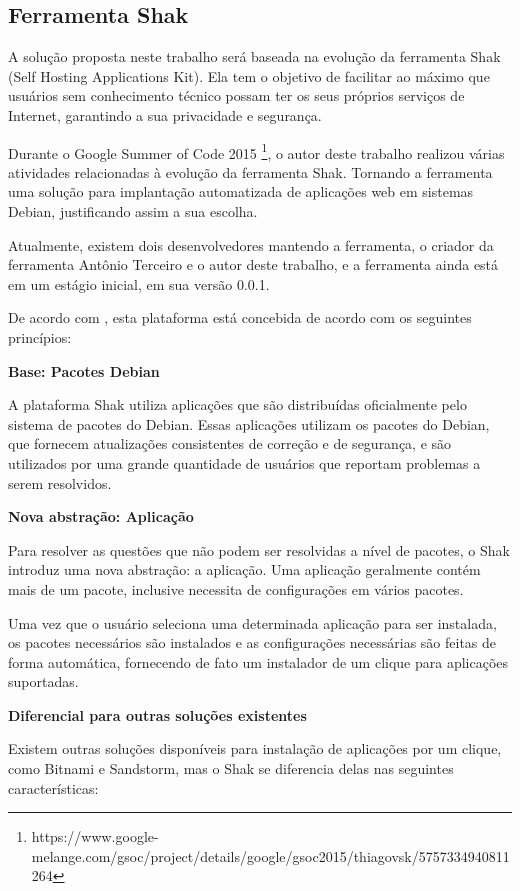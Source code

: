 \subsection{Ferramenta Shak}

A solução proposta neste trabalho será baseada na evolução da ferramenta Shak
(Self Hosting Applications Kit). Ela tem o objetivo de facilitar 
ao máximo que usuários sem conhecimento técnico possam ter os seus próprios 
serviços de Internet, garantindo a sua privacidade e segurança. 

Durante o Google Summer of Code 2015 \footnote{https://www.google-melange.com/gsoc/project/details/google/gsoc2015/thiagovsk/5757334940811264}, o autor deste trabalho realizou 
várias atividades relacionadas à evolução da ferramenta Shak. Tornando a ferramenta uma
 solução para implantação automatizada de aplicações web em sistemas Debian, 
justificando assim a sua escolha.

Atualmente, existem dois desenvolvedores mantendo a ferramenta, o criador da ferramenta
Antônio Terceiro e o autor deste trabalho, e a ferramenta ainda está em um estágio
inicial, em sua versão 0.0.1.

De acordo com , esta plataforma está concebida de acordo 
com os seguintes princípios:

\textbf{Base: Pacotes Debian}

A plataforma Shak utiliza aplicações que são distribuídas oficialmente pelo 
sistema de pacotes do Debian. Essas aplicações utilizam os
pacotes do Debian, que fornecem atualizações consistentes de correção e de segurança,
e são utilizados por uma grande quantidade de usuários que reportam problemas a
serem resolvidos.

\textbf{Nova abstração: Aplicação}

Para resolver as questões que não podem ser resolvidas a nível de pacotes, o
Shak introduz uma nova abstração: a aplicação. Uma aplicação geralmente
contém mais de um pacote, inclusive necessita de configurações em vários pacotes.

Uma vez que o usuário seleciona uma determinada aplicação para
ser instalada, os pacotes necessários são instalados e as configurações
necessárias são feitas de forma automática, fornecendo de fato um instalador
de um clique para aplicações suportadas. 

\textbf{Diferencial para outras soluções existentes}

Existem outras soluções disponíveis para instalação de aplicações por um clique,
como Bitnami e Sandstorm, mas o Shak se
diferencia delas nas seguintes características:


